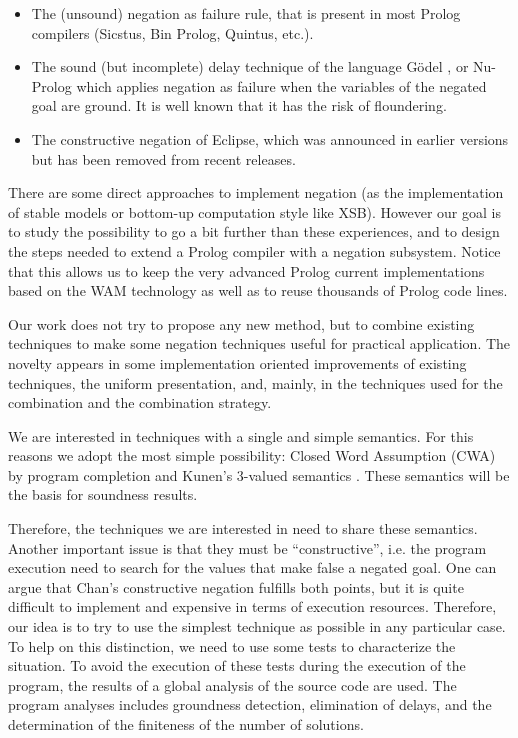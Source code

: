 \documentclass[]{llncs}
\newlength{\zero}
\renewcommand{\topsep}{\zero}
\begin{document}

\begin{itemize}
\item The (unsound) negation as failure rule, that is present in most
  Prolog compilers (Sicstus, Bin Prolog, Quintus, etc.).
\item The sound (but incomplete) delay technique of the language
  G\"odel \cite{Goedel}, or Nu-Prolog \cite{Naish} which applies
  negation as failure when the variables of the negated goal are
  ground. It is well known that it has the risk of floundering.
\item The constructive negation of Eclipse, which was announced in
  earlier versions but has been removed from recent releases.
\end{itemize}

There are some direct approaches to implement negation (as the implementation of
 stable models or bottom-up computation style like XSB). However
our goal is to  study the possibility to go a bit further
than these experiences, and to design the steps needed to extend a
Prolog compiler with a negation subsystem. Notice that this allows us
to keep the very advanced Prolog current implementations based on
the WAM technology as well as to reuse thousands of Prolog code lines.

Our work does not try to propose any new method, but to combine
existing techniques to make some negation techniques useful for
practical application. The novelty appears in some implementation
oriented improvements of existing techniques, the uniform
presentation, and, mainly, in the techniques used for the combination
and the combination strategy.

We are interested in techniques with a single and simple semantics.
For this reasons we adopt the most simple possibility: Closed Word
Assumption (CWA) \cite{Clark} by program completion and Kunen's
3-valued semantics \cite{Kunen}. These semantics will be the basis for
soundness results.

Therefore, the techniques we are interested in need to share these
semantics. Another important issue is that they must be
``constructive'', i.e. the program execution need to search for the
values that make false a negated goal. One can argue that Chan's
constructive negation \cite{Chan1,Chan2} fulfills both points, but it
is quite difficult to implement and expensive in terms of execution
resources.  Therefore, our idea is to try to use the simplest
technique as possible in any particular case. To help on this
distinction, we need to use some tests to characterize the situation.
To avoid the execution of these tests during the execution of the
program, the results of a global analysis of the source code are used.
The program analyses includes groundness detection, elimination of
delays, and the determination of the finiteness of the number of
solutions.
\end{document}
